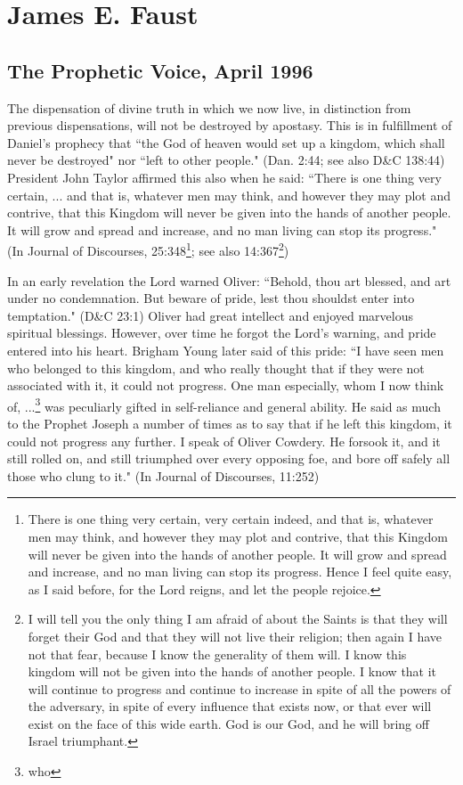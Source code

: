 \section{James E. Faust}

\subsection{The Prophetic Voice, April 1996}

The dispensation of divine truth in which we now live, in distinction from previous dispensations, will not be destroyed by apostasy. This is in fulfillment of Daniel’s prophecy that ``the God of heaven would set up a kingdom, which shall never be destroyed" nor ``left to other people." (Dan. 2:44; see also D\&C 138:44) President John Taylor affirmed this also when he said: ``There is one thing very certain, ... and that is, whatever men may think, and however they may plot and contrive, that this Kingdom will never be given into the hands of another people. It will grow and spread and increase, and no man living can stop its progress." (In Journal of Discourses, 25:348\footnote{There is one thing very certain, very certain indeed, and that is, whatever men may think, and however they may plot and contrive, that this Kingdom will never be given into the hands of another people. It will grow and spread and increase, and no man living can stop its progress. Hence I feel quite easy, as I said before, for the Lord reigns, and let the people rejoice.}; see also 14:367\footnote{I will tell you the only thing I am afraid of about the Saints is that they will forget their God and that they will not live their religion; then again I have not that fear, because I know the generality of them will. I know this kingdom will not be given into the hands of another people. I know that it will continue to progress and continue to increase in spite of all the powers of the adversary, in spite of every influence that exists now, or that ever will exist on the face of this wide earth. God is our God, and he will bring off Israel triumphant.})

In an early revelation the Lord warned Oliver: ``Behold, thou art blessed, and art under no condemnation. But beware of pride, lest thou shouldst enter into temptation." (D\&C 23:1) Oliver had great intellect and enjoyed marvelous spiritual blessings. However, over time he forgot the Lord’s warning, and pride entered into his heart. Brigham Young later said of this pride: ``I have seen men who belonged to this kingdom, and who really thought that if they were not associated with it, it could not progress. One man especially, whom I now think of, ...\footnote{who} was peculiarly gifted in self-reliance and general ability. He said as much to the Prophet Joseph a number of times as to say that if he left this kingdom, it could not progress any further. I speak of Oliver Cowdery. He forsook it, and it still rolled on, and still triumphed over every opposing foe, and bore off safely all those who clung to it." (In Journal of Discourses, 11:252)

